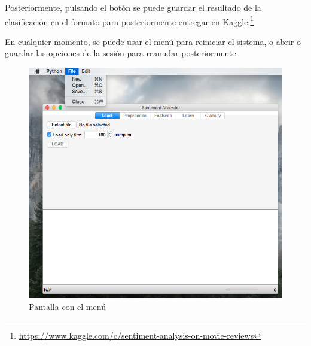 Posteriormente, pulsando el botón  se puede guardar el resultado de la clasificación en el formato  para posteriormente entregar en Kaggle.\footnote{\url{https://www.kaggle.com/c/sentiment-analysis-on-movie-reviews}}

\newpage
En cualquier momento, se puede usar el menú  para reiniciar el sistema, o abrir o guardar las opciones de la sesión para reanudar posteriormente.

\begin{figure}[H]
\centering
\includegraphics[width=\textwidth]{ss-12-menu-file}
\caption[Pantalla con el menú ]{Pantalla con el menú }
\label{fig:ss-12-menu-file}
\end{figure}

